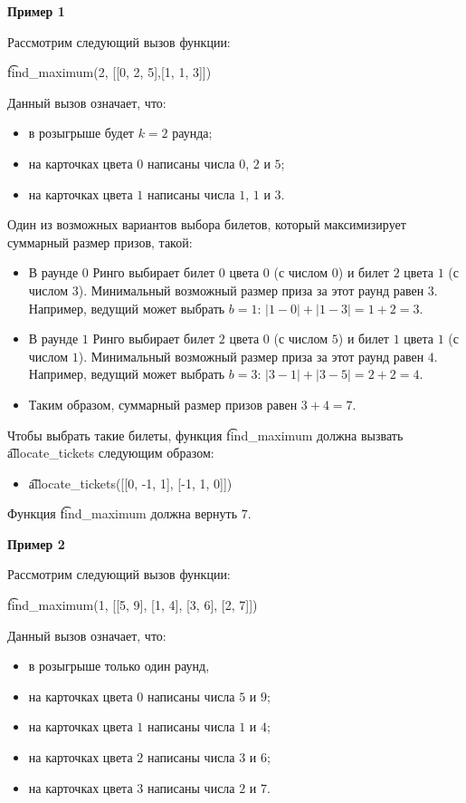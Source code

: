 \textbf{Пример 1}

Рассмотрим следующий вызов функции:

\t{find\_maximum(2, [[0, 2, 5],[1, 1, 3]])}

Данный вызов означает, что:
\begin{itemize}
\item в розыгрыше будет $k=2$ раунда;
\item на карточках цвета $0$ написаны числа $0$, $2$ и $5$;
\item на карточках цвета $1$ написаны числа $1$, $1$ и $3$.
\end{itemize}

Один из возможных вариантов выбора билетов, который максимизирует суммарный размер призов, такой:
\begin{itemize}
\item В раунде $0$ Ринго выбирает билет $0$ цвета $0$ (с числом $0$) и билет $2$ цвета $1$ (с числом $3$). Минимальный возможный размер приза за этот раунд равен $3$. Например, ведущий может выбрать $b = 1$: $|1 - 0| + |1 - 3| = 1 + 2 = 3$.
\item В раунде $1$ Ринго выбирает билет $2$ цвета $0$ (с числом $5$) и билет $1$ цвета $1$ (с числом $1$). Минимальный возможный размер приза за этот раунд равен $4$. Например, ведущий может выбрать $b = 3$: $|3 - 1| + |3 - 5| = 2 + 2 = 4$.
\item Таким образом, суммарный размер призов равен $3 + 4 = 7$.
\end{itemize}


Чтобы выбрать такие билеты, функция \t{find\_maximum} должна вызвать \t{allocate\_tickets} следующим образом:
\begin{itemize}
\item \t{allocate\_tickets([[0, -1, 1], [-1, 1, 0]])}
\end{itemize}

Функция \t{find\_maximum} должна вернуть $7$.

\textbf{Пример 2}

Рассмотрим следующий вызов функции:

\t{find\_maximum(1, [[5, 9], [1, 4], [3, 6], [2, 7]])}

Данный вызов означает, что:
\begin{itemize}
\item в розыгрыше только один раунд,
\item на карточках цвета $0$ написаны числа $5$ и $9$;
\item на карточках цвета $1$ написаны числа $1$ и $4$;
\item на карточках цвета $2$ написаны числа $3$ и $6$;
\item на карточках цвета $3$ написаны числа $2$ и $7$.
\end{itemize}

